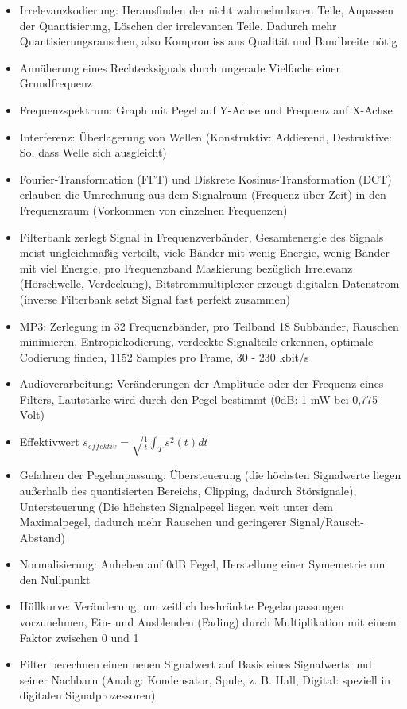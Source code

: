 \documentclass[12pt,landscape]{article}
\begin{document}
\begin{multicols}{3}
\begin{itemize}
\item Irrelevanzkodierung: Herausfinden der nicht wahrnehmbaren Teile, Anpassen der Quantisierung, Löschen der irrelevanten Teile. Dadurch mehr Quantisierungsrauschen, also Kompromiss aus Qualität und Bandbreite nötig
\item Annäherung eines Rechtecksignals durch ungerade Vielfache einer Grundfrequenz
\item Frequenzspektrum: Graph mit Pegel auf Y-Achse und Frequenz auf X-Achse
\item Interferenz: Überlagerung von Wellen (Konstruktiv: Addierend, Destruktive: So, dass Welle sich ausgleicht)
\item Fourier-Transformation (FFT) und Diskrete Kosinus-Transformation (DCT) erlauben die Umrechnung aus dem Signalraum (Frequenz über Zeit) in den Frequenzraum (Vorkommen von einzelnen Frequenzen)
\item Filterbank zerlegt Signal in Frequenzverbänder, Gesamtenergie des Signals meist ungleichmäßig verteilt, viele Bänder mit wenig Energie, wenig Bänder mit viel Energie, pro Frequenzband Maskierung bezüglich Irrelevanz (Hörschwelle, Verdeckung), Bitstrommultiplexer erzeugt digitalen Datenstrom (inverse Filterbank setzt Signal fast perfekt zusammen)
\item MP3: Zerlegung in 32 Frequenzbänder, pro Teilband 18 Subbänder, Rauschen minimieren, Entropiekodierung, verdeckte Signalteile erkennen, optimale Codierung finden, 1152 Samples pro Frame, 30 - 230 kbit/s
\item Audioverarbeitung: Veränderungen der Amplitude oder der Frequenz eines Filters, Lautstärke wird durch den Pegel bestimmt (0dB: 1 mW bei 0,775 Volt)
\item Effektivwert $s_{effektiv} = \sqrt{\frac{1}{t}\int_{T}s^2(t)dt}$
\item Gefahren der Pegelanpassung: Übersteuerung (die höchsten Signalwerte liegen außerhalb des quantisierten Bereichs, Clipping, dadurch Störsignale), Untersteuerung (Die höchsten Signalpegel liegen weit unter dem Maximalpegel, dadurch mehr Rauschen und geringerer Signal/Rausch-Abstand)
\item Normalisierung: Anheben auf 0dB Pegel, Herstellung einer Symemetrie um den Nullpunkt
\item Hüllkurve: Veränderung, um zeitlich beshränkte Pegelanpassungen vorzunehmen, Ein- und Ausblenden (Fading) durch Multiplikation mit einem Faktor zwischen 0 und 1
\item Filter berechnen einen neuen Signalwert auf Basis eines Signalwerts und seiner Nachbarn (Analog: Kondensator, Spule, z. B. Hall, Digital: speziell in digitalen Signalprozessoren)

\end{itemize}
\end{multicols}
\end{document}
